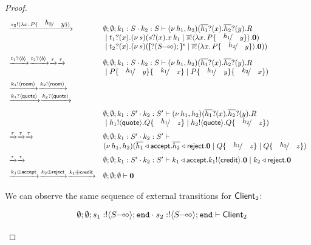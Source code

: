 \begin{proof}
\[\begin{array}{ll}
		\by{\bactout{s_2}{\abs{x}{P \subst{h_2}{y}}}}&
		\es; \es; k_1: S \cat k_2: S \proves \newsp{h_1, h_2}{
		\binp{\dual{h_1}}{x} \binp{\dual{h_2}}{y} R\\
		& \Par \binp{t_1}{x} \newsp{s}{\binp{s}{x} \appl{x}{k_1} \Par \bout{\dual{s}}{\abs{x}{P \subst{h_1}{y}}} \inact }\\
		& \Par \binp{t_2}{x} \newsp{s}{\mapchar{\btinp{\lhot{S}}}{s} \Par \bout{\dual{s}}{\abs{x}{P \subst{h_2}{y}}} \inact }}
		\\[2mm]

		\by{\bactinp{t_1}{b}} \by{\bactinp{t_2}{b}} \by{\tau}\by{\tau}&
		\es; \es; k_1: S \cat k_2: S \proves \newsp{h_1, h_2}{
		\binp{\dual{h_1}}{x} \binp{\dual{h_2}}{y} R\\
		& \Par P\subst{h_1}{y} \subst{k_1}{x} \Par P\subst{h_1}{y} \subst{k_2}{x}}
		\\[2mm]

		\by{\bactout{k_1}{\rtype}} \by{\bactout{k_2}{\rtype}}\\
		\by{\bactinp{k_1}{\Quote}} \by{\bactinp{k_2}{\Quote}}
		\\[2mm]

		& \es; \es; k_1: S' \cat k_2: S' \proves \newsp{h_1, h_2}{
		\binp{\dual{h_1}}{x} \binp{\dual{h_2}}{y} R\\
		& \Par \bout{h_1}{\Quote} Q \subst{h_1}{z} \Par \bout{h_2}{\Quote} Q \subst{h_2}{z}}
		\\[2mm]

		\by{\tau} \by{\tau} \by{\tau}&
		\es; \es; k_1: S' \cat k_2: S' \proves \\
		& \newsp{h_1, h_2}{\bsel{\dual{h_1}}{\accept} \bsel{\dual{h_2}}{\reject} \inact
		\Par Q \subst{h_1}{z} \Par Q \subst{h_2}{z}}
		\\[2mm]

		\by{\tau} \by{\tau}&
		\es; \es; k_1: S' \cat k_2: S' \proves
		\bsel{k_1}{\accept} \bout{k_1}{\creditc} \inact 
		\Par \bsel{k_2}{\reject} \inact
		\\[2mm]

		\by{\bactsel{k_1}{\accept}} \by{\bactsel{k_2}{\reject}} \by{\bactsel{k_1}{\creditc}}&
		\es; \es; \es \proves \inact
	\end{array}
\]

\noi	We can observe the same sequence of external transitions for $\mathsf{Client}_2$:

\[
	\begin{array}{ll}
		& \es; \es; s_1: \btout{\lhot{S}} \tinact \cat s_2: \btout{\lhot{S}} \tinact \proves \Client_2
\\[2mm]


\end{array}\]
\end{proof}
